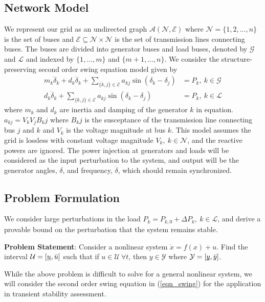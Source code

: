 \documentclass[journal]{IEEEtran}
\theoremstyle{definition}
\begin{document}
\subsection{Network Model}
We represent our grid as an undirected graph $\mathcal{A}(\mathcal{N},\mathcal{E})$ where $\mathcal{N}=\{1,2,...,n\}$ is the set of buses and $\mathcal{E}\subseteq\mathcal{N}\times\mathcal{N}$ is the set of transmission lines connecting buses. The buses are divided into generator buses and load buses, denoted by $\mathcal{G}$ and $\mathcal{L}$ and indexed by $\{1,...,m\}$ and $\{m+1,...,n\}$.
We consider the structure-preserving second order swing equation model given by
\begin{equation}
\begin{aligned}
m_k\ddot{\delta}_k+d_k\dot{\delta}_k+\sum_{\{k,j\}\in\mathcal{E}}a_{kj}\sin(\delta_k-\delta_j)&=P_k,\ k\in\mathcal{G} \\
d_k\dot{\delta}_k+\sum_{\{k,j\}\in\mathcal{E}}a_{kj}\sin(\delta_k-\delta_j)&=P_k,\ k\in\mathcal{L}
\end{aligned}
\label{eqn_swing}
\end{equation}
where $m_k$ and $d_k$ are inertia and damping of the generator $k$ in equation.$a_{kj}=V_kV_jB_kj$ where $B_kj$ is the susceptance of the transmission line connecting bus $j$ and $k$ and $V_k$ is the voltage magnitude at bus $k$. This model assumes the grid is lossless with constant voltage magnitude $V_k, \ k\in\mathcal{N}$, and the reactive powers are ignored. The power injection at generators and loads will be considered as the input perturbation to the system, and output will be the generator angles, $\delta$, and frequency, $\dot{\delta}$, which should remain synchronized.

\subsection{Problem Formulation}
We consider large perturbations in the load $P_k=P_{k,0}+\Delta P_k, \ k\in\mathcal{L}$, and derive a provable bound on the perturbation that the system remains stable.

\noindent\textbf{Problem Statement}: Consider a nonlinear system $\dot{x}=f(x)+u$. Find the interval $\mathcal{U}=[\underbar{$u$},\bar{u}]$ such that if $u\in\mathcal{U}\ \forall t$, then $y\in\mathcal{Y}$ where $\mathcal{Y}=[\underbar{$y$},\bar{y}]$.

While the above problem is difficult to solve for a general nonlinear system, we will consider the second order swing equation in (\ref{eqn_swing}) for the application in transient stability assessment.
\end{document}
